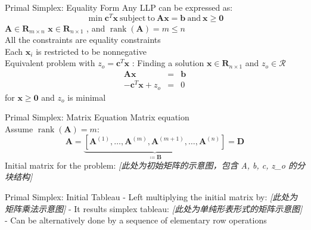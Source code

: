 \documentclass[aspectratio=169,hyperref,UTF8,CJK]{beamer}
\begin{document}
\begin{frame}{Primal Simplex: Equality Form}
Any LLP can be expressed as:
\[
\min \mathbf{c}^T\mathbf{x}\mathrm{~subject~to~}\mathbf{A}\mathbf{x} = \mathbf{b}\mathrm{~and~}\mathbf{x}\geq \mathbf{0}
\]
\(\mathbf{A} \in \mathbf{R}_{m\times n}\) \(\mathbf{x}\in \mathbf{R}_{n\times 1}\) , and \(\operatorname {rank}(\mathbf{A}) = m\leq n\) \\
All the constraints are equality constraints \\
Each \(\mathbf{x}_i\) is restricted to be nonnegative \\
Equivalent problem with \(z_{o} = \mathbf{c}^{T}\mathbf{x}\) : Finding a solution \(\mathbf{x}\in \mathbf{R}_{n\times 1}\) and \(z_{o}\in \mathcal{R}\)
\[
\begin{array}{rcl}{\mathbf{A}\mathbf{x}} & = & {\mathbf{b}}\\ {-\mathbf{c}^{T}\mathbf{x} + z_{o}} & = & {0} \end{array}
\]
for \(\mathbf{x}\geq \mathbf{0}\) and \(z_{o}\) is minimal
\end{frame}

\begin{frame}{Primal Simplex: Matrix Equation}
Matrix equation \\
Assume \(\operatorname{rank}(\mathbf{A}) = m\):
\[
\mathbf{A} = \underbrace{\left[\mathbf{A}^{(1)},\ldots,\mathbf{A}^{(m)},\mathbf{A}^{(m + 1)},\ldots,\mathbf{A}^{(n)}\right]}_{\coloneqq \mathbf{B}} = \mathbf{D}
\]
Initial matrix for the problem:
\textit{[此处为初始矩阵的示意图，包含 A, b, c, z_o 的分块结构]}
\end{frame}

\begin{frame}{Primal Simplex: Initial Tableau}
- Left multiplying the initial matrix by:
\textit{[此处为矩阵乘法示意图]}
- It results simplex tableau:
\textit{[此处为单纯形表形式的矩阵示意图]}
- Can be alternatively done by a sequence of elementary row operations
\end{frame}
\end{document}
